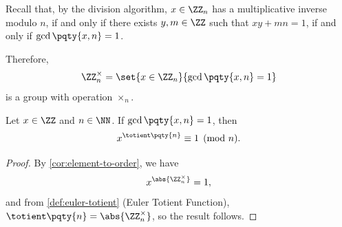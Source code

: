 Recall that, by the division algorithm, \(x \in \ZZ_n\) has a multiplicative inverse modulo \(n\), if and only if there exists \(y, m \in \ZZ\) such that \(xy + mn = 1\), if and only if \(\gcd\pqty{x, n} = 1\).

Therefore,
\[
    \ZZ_n^{\times} = \set{x \in \ZZ_n}{\gcd\pqty{x, n} = 1}
\]
is a group with operation \(\times_n\).

\begin{theorem}
    \label{thm:fermat-euler}%
    Let \(x \in \ZZ\) and \(n \in \NN\). If \(\gcd\pqty{x, n} = 1\), then
    \[
        x^{\totient\pqty{n}} \equiv 1 \pmod{n}.
    \]
\end{theorem}

\begin{proof}
    By \autoref{cor:element-to-order}, we have
    \[
        x^{\abs{\ZZ_n^{\times}}} = 1,
    \]
    and from \autoref{def:euler-totient} (Euler Totient Function), \(\totient\pqty{n} = \abs{\ZZ_n^{\times}}\), so the result follows.
\end{proof}
